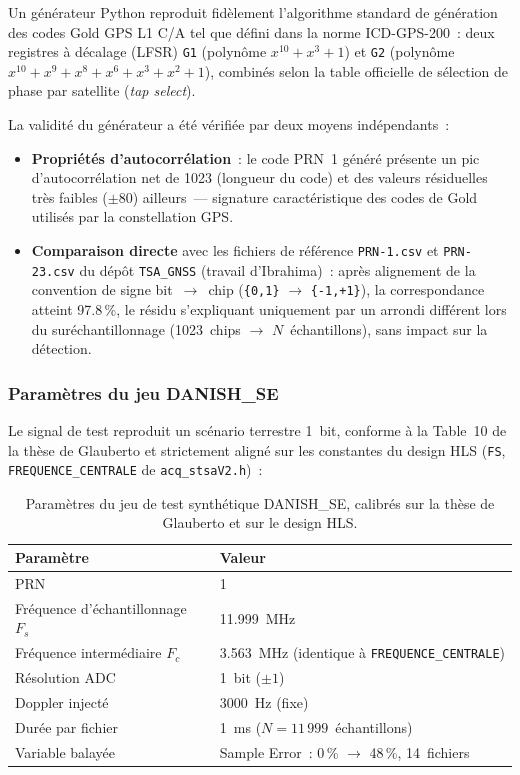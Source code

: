\documentclass[11pt,a4paper]{article}
\begin{document}
Un générateur Python reproduit fidèlement l'algorithme standard de génération des codes Gold GPS L1 C/A tel que défini dans la norme ICD-GPS-200~: deux registres à décalage (LFSR) \texttt{G1} (polynôme $x^{10}+x^3+1$) et \texttt{G2} (polynôme $x^{10}+x^9+x^8+x^6+x^3+x^2+1$), combinés selon la table officielle de sélection de phase par satellite (\textit{tap select}).

La validité du générateur a été vérifiée par deux moyens indépendants~:
\begin{itemize}
  \item \textbf{Propriétés d'autocorrélation}~: le code PRN~1 généré présente un pic d'autocorrélation net de 1023 (longueur du code) et des valeurs résiduelles très faibles ($\pm$80) ailleurs~--- signature caractéristique des codes de Gold utilisés par la constellation GPS.
  \item \textbf{Comparaison directe} avec les fichiers de référence \texttt{PRN-1.csv} et \texttt{PRN-23.csv} du dépôt \texttt{TSA\_GNSS} (travail d'Ibrahima)~: après alignement de la convention de signe bit~$\to$~chip (\texttt{\{0,1\}} $\to$ \texttt{\{-1,+1\}}), la correspondance atteint 97.8\,\%, le résidu s'expliquant uniquement par un arrondi différent lors du suréchantillonnage (1023~chips $\to$ $N$~échantillons), sans impact sur la détection.
\end{itemize}

\subsubsection{Paramètres du jeu DANISH\_SE}

Le signal de test reproduit un scénario terrestre 1~bit, conforme à la Table~10 de la thèse de Glauberto et strictement aligné sur les constantes du design HLS (\texttt{FS}, \texttt{FREQUENCE\_CENTRALE} de \texttt{acq\_stsaV2.h})~:

\begin{table}[H]
\centering
\renewcommand{\arraystretch}{1.3}
\begin{tabular}{ll}
\toprule
\textbf{Paramètre} & \textbf{Valeur} \\
\midrule
PRN & 1 \\
Fréquence d'échantillonnage $F_s$ & 11.999~MHz \\
Fréquence intermédiaire $F_c$ & 3.563~MHz (identique à \texttt{FREQUENCE\_CENTRALE}) \\
Résolution ADC & 1~bit ($\pm1$) \\
Doppler injecté & 3000~Hz (fixe) \\
Durée par fichier & 1~ms ($N=11\,999$~échantillons) \\
Variable balayée & Sample Error~: 0\,\% $\to$ 48\,\%, 14~fichiers \\
\bottomrule
\end{tabular}
\caption{Paramètres du jeu de test synthétique DANISH\_SE, calibrés sur la thèse de Glauberto et sur le design HLS.}
\end{table}
\end{document}
